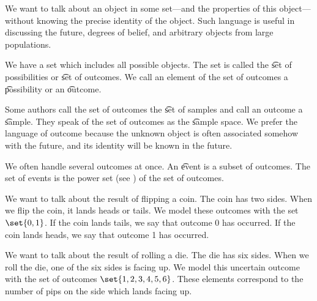 

We want to talk about an object in some set---and the properties of this object---without knowing the precise identity of the object.
Such language is useful in discussing the future, degrees of belief, and arbitrary objects from large populations.


We have a set which includes all possible objects.
The set is called the \t{set of possibilities} or \t{set of outcomes}.
We call an element of the set of outcomes a \t{possibility} or an \t{outcome}.

Some authors call the set of outcomes the \t{set of samples} and call an outcome a \t{sample}.
They speak of the set of outcomes as the \t{sample space}.
We prefer the language of outcome because the unknown object is often associated somehow with the future, and its identity will be known in the future.

We often handle several outcomes at once.
An \t{event} is a subset of outcomes.
The set of events is the power set (see ) of the set of outcomes.


We want to talk about the result of flipping a coin.
The coin has two sides.
When we flip the coin, it lands heads or tails.
We model these outcomes with the set $\set{0, 1}$.
If the coin lands tails, we say that outcome 0 has occurred.
If the coin lands heads, we say that outcome 1 has occurred.


We want to talk about the result of rolling a die.
The die has six sides.
When we roll the die, one of the six sides is facing up.
We model this uncertain outcome with the set of outcomes $\set{1, 2, 3, 4, 5, 6}$.
These elements correspond to the number of pips on the side which lands facing up.
